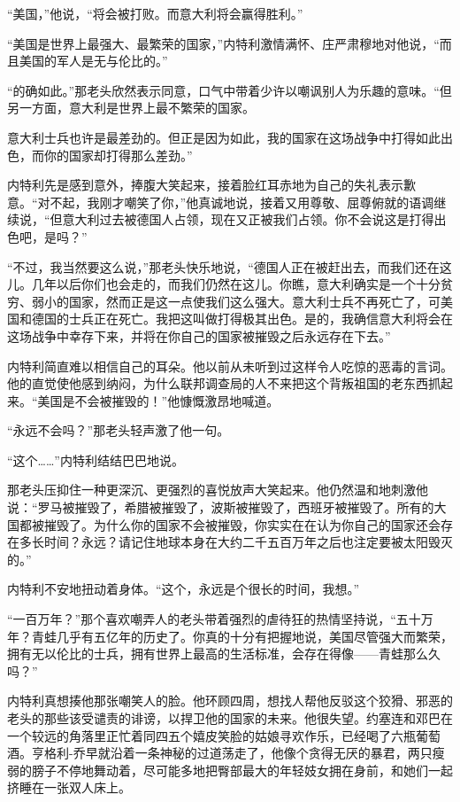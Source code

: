     “美国，”他说，“将会被打败。而意大利将会赢得胜利。”

    “美国是世界上最强大、最繁荣的国家，”内特利激情满怀、庄严肃穆地对他说，“而且美国的军人是无与伦比的。”

    “的确如此。”那老头欣然表示同意，口气中带着少许以嘲讽别人为乐趣的意味。“但另一方面，意大利是世界上最不繁荣的国家。

 


    意大利士兵也许是最差劲的。但正是因为如此，我的国家在这场战争中打得如此出色，而你的国家却打得那么差劲。”

    内特利先是感到意外，捧腹大笑起来，接着脸红耳赤地为自己的失礼表示歉意。“对不起，我刚才嘲笑了你，”他真诚地说，接着又用尊敬、屈尊俯就的语调继续说，“但意大利过去被德国人占领，现在又正被我们占领。你不会说这是打得出色吧，是吗？”

    “不过，我当然要这么说，”那老头快乐地说，“德国人正在被赶出去，而我们还在这儿。几年以后你们也会走的，而我们仍然在这儿。你瞧，意大利确实是一个十分贫穷、弱小的国家，然而正是这一点使我们这么强大。意大利士兵不再死亡了，可美国和德国的士兵正在死亡。我把这叫做打得极其出色。是的，我确信意大利将会在这场战争中幸存下来，并将在你自己的国家被摧毁之后永远存在下去。”

    内特利简直难以相信自己的耳朵。他以前从未听到过这样令人吃惊的恶毒的言词。他的直觉使他感到纳闷，为什么联邦调查局的人不来把这个背叛祖国的老东西抓起来。“美国是不会被摧毁的！”他慷慨激昂地喊道。

    “永远不会吗？”那老头轻声激了他一句。

    “这个……”内特利结结巴巴地说。

    那老头压抑住一种更深沉、更强烈的喜悦放声大笑起来。他仍然温和地刺激他说：“罗马被摧毁了，希腊被摧毁了，波斯被摧毁了，西班牙被摧毁了。所有的大国都被摧毁了。为什么你的国家不会被摧毁，你实实在在认为你自己的国家还会存在多长时间？永远？请记住地球本身在大约二千五百万年之后也注定要被太阳毁灭的。”

    内特利不安地扭动着身体。“这个，永远是个很长的时间，我想。”

    “一百万年？”那个喜欢嘲弄人的老头带着强烈的虐待狂的热情坚持说，“五十万年？青蛙几乎有五亿年的历史了。你真的十分有把握地说，美国尽管强大而繁荣，拥有无以伦比的士兵，拥有世界上最高的生活标准，会存在得像——青蛙那么久吗？”

    内特利真想揍他那张嘲笑人的脸。他环顾四周，想找人帮他反驳这个狡猾、邪恶的老头的那些该受谴责的诽谤，以捍卫他的国家的未来。他很失望。约塞连和邓巴在一个较远的角落里正忙着同四五个嬉皮笑脸的姑娘寻欢作乐，已经喝了六瓶葡萄酒。亨格利-乔早就沿着一条神秘的过道荡走了，他像个贪得无厌的暴君，两只瘦弱的膀子不停地舞动着，尽可能多地把臀部最大的年轻妓女拥在身前，和她们一起挤睡在一张双人床上。
 


